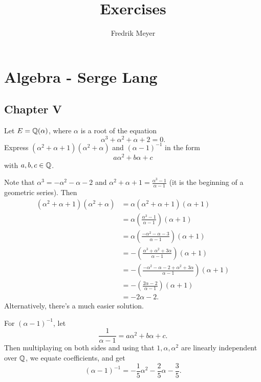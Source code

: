 \documentclass[11pt, english]{article}
\begin{document}
\title{Exercises}
\author{Fredrik Meyer}
\maketitle

\tableofcontents 

\section{Algebra - Serge Lang}

\subsection{Chapter V}

\begin{exc}
 Let $E=\mathbb{Q}(\alpha)$, where $\alpha$ is a root of the equation
\[
\alpha^3+ \alpha^2+\alpha+2 = 0.
\]
Express $(\alpha^2+\alpha+1)(\alpha^2+\alpha)$ and $(\alpha-1)^{-1}$ in the form
\[
a\alpha^2+b\alpha + c 
\]
with $a,b,c \in \mathbb{Q}$.
\end{exc}

\begin{sol}
Note that $\alpha^3 = -\alpha^2-\alpha - 2$ and $\alpha^2+\alpha+1=\frac{\alpha^3-1}{\alpha-1}$ (it is the beginning of a geometric series). Then
\begin{align*}
(\alpha^2+\alpha+1)(\alpha^2+\alpha) &= \alpha(\alpha^2+\alpha+1)(\alpha+1) \\
&= \alpha \left(\frac{ \alpha^3 -1}{\alpha-1} \right) (\alpha+1) \\
&= \alpha \left( \frac{-\alpha^2-\alpha- 3}{\alpha-1} \right) (\alpha+1) \\
&= -\left( \frac{\alpha^3+\alpha^2+3\alpha}{\alpha-1} \right)(\alpha+1) \\
&= -\left( \frac{-\alpha^2-\alpha-2 + \alpha^2+3\alpha}{\alpha-1}\right) (\alpha+1) \\
&= -\left( \frac{2\alpha - 2}{\alpha-1} \right) (\alpha+1) \\
&= -2\alpha-2.
\end{align*}
Alternatively, there's a much easier solution.


For $(\alpha-1)^{-1}$, let 
\[
\frac{1}{\alpha-1} = a\alpha^2+b\alpha+ c.
\]
Then multiplaying on both sides and using that $1,\alpha, \alpha^2$ are linearly independent over $\mathbb{Q}$, we equate coefficients, and get
\[
(\alpha-1)^{-1} = -\frac 15 \alpha^2 -\frac 25 \alpha - \frac 35.
\]
\end{sol}
\end{document}
